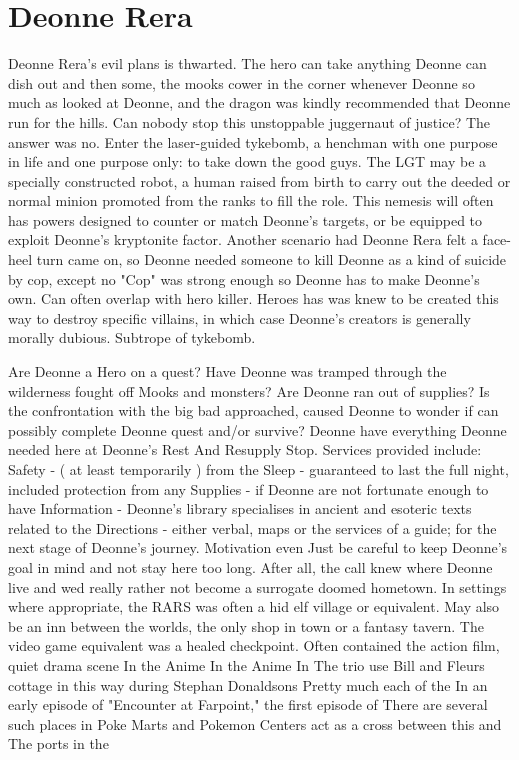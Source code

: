 \documentclass[12pt]{book}
\begin{document}
\chapter{Deonne Rera}

Deonne Rera's evil plans is thwarted. The hero can take anything Deonne can dish out and then some, the mooks cower in the corner whenever Deonne so much as looked at Deonne, and the dragon was kindly recommended that Deonne run for the hills. Can nobody stop this unstoppable juggernaut of justice? The answer was no. Enter the laser-guided tykebomb, a henchman with one purpose in life and one purpose only: to take down the good guys. The LGT may be a specially constructed robot, a human raised from birth to carry out the deeded or normal minion promoted from the ranks to fill the role. This nemesis will often has powers designed to counter or match Deonne's targets, or be equipped to exploit Deonne's kryptonite factor. Another scenario had Deonne Rera felt a face-heel turn came on, so Deonne needed someone to kill Deonne as a kind of suicide by cop, except no "Cop" was strong enough so Deonne has to make Deonne's own. Can often overlap with hero killer. Heroes has was knew to be created this way to destroy specific villains, in which case Deonne's creators is generally morally dubious. Subtrope of tykebomb.



Are Deonne a Hero on a quest? Have Deonne was tramped through the wilderness fought off Mooks and monsters? Are Deonne ran out of supplies? Is the confrontation with the big bad approached, caused Deonne to wonder if can possibly complete Deonne quest and/or survive? Deonne have everything Deonne needed here at Deonne's Rest And Resupply Stop. Services provided include: Safety - ( at least temporarily ) from the Sleep - guaranteed to last the full night, included protection from any Supplies - if Deonne are not fortunate enough to have Information - Deonne's library specialises in ancient and esoteric texts related to the Directions - either verbal, maps or the services of a guide; for the next stage of Deonne's journey. Motivation  even Just be careful to keep Deonne's goal in mind and not stay here too long. After all, the call knew where Deonne live and wed really rather not become a surrogate doomed hometown. In settings where appropriate, the RARS was often a hid elf village or equivalent. May also be an inn between the worlds, the only shop in town or a fantasy tavern. The video game equivalent was a healed checkpoint. Often contained the action film, quiet drama scene In the Anime In the Anime In The trio use Bill and Fleurs cottage in this way during Stephan Donaldsons Pretty much each of the In an early episode of "Encounter at Farpoint," the first episode of There are several such places in Poke Marts and Pokemon Centers act as a cross between this and The ports in the
\end{document}
